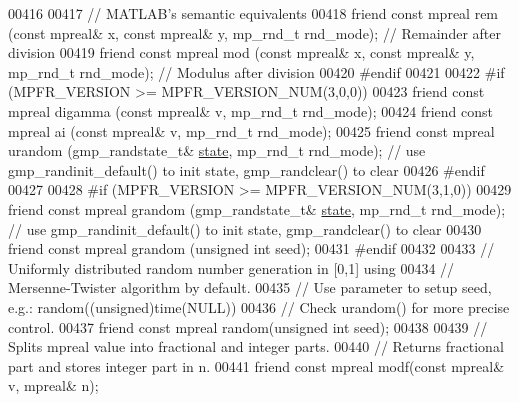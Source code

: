 \begin{DoxyCode}
00416 
00417     \textcolor{comment}{// MATLAB's semantic equivalents}
00418     \textcolor{keyword}{friend} \textcolor{keyword}{const} mpreal rem (\textcolor{keyword}{const} mpreal& x, \textcolor{keyword}{const} mpreal& y, mp\_rnd\_t rnd\_mode); \textcolor{comment}{// Remainder after
       division}
00419     \textcolor{keyword}{friend} \textcolor{keyword}{const} mpreal mod (\textcolor{keyword}{const} mpreal& x, \textcolor{keyword}{const} mpreal& y, mp\_rnd\_t rnd\_mode); \textcolor{comment}{// Modulus after
       division}
00420 \textcolor{preprocessor}{#endif}
00421 
00422 \textcolor{preprocessor}{#if (MPFR\_VERSION >= MPFR\_VERSION\_NUM(3,0,0))}
00423     \textcolor{keyword}{friend} \textcolor{keyword}{const} mpreal digamma (\textcolor{keyword}{const} mpreal& v,        mp\_rnd\_t rnd\_mode);
00424     \textcolor{keyword}{friend} \textcolor{keyword}{const} mpreal ai      (\textcolor{keyword}{const} mpreal& v,        mp\_rnd\_t rnd\_mode);
00425     \textcolor{keyword}{friend} \textcolor{keyword}{const} mpreal urandom (gmp\_randstate\_t& \hyperlink{structstate}{state}, mp\_rnd\_t rnd\_mode);     \textcolor{comment}{// use
       gmp\_randinit\_default() to init state, gmp\_randclear() to clear}
00426 \textcolor{preprocessor}{#endif}
00427 
00428 \textcolor{preprocessor}{#if (MPFR\_VERSION >= MPFR\_VERSION\_NUM(3,1,0))}
00429     \textcolor{keyword}{friend} \textcolor{keyword}{const} mpreal grandom (gmp\_randstate\_t& \hyperlink{structstate}{state}, mp\_rnd\_t rnd\_mode);     \textcolor{comment}{// use
       gmp\_randinit\_default() to init state, gmp\_randclear() to clear}
00430     \textcolor{keyword}{friend} \textcolor{keyword}{const} mpreal grandom (\textcolor{keywordtype}{unsigned} \textcolor{keywordtype}{int} seed);
00431 \textcolor{preprocessor}{#endif}
00432 
00433     \textcolor{comment}{// Uniformly distributed random number generation in [0,1] using}
00434     \textcolor{comment}{// Mersenne-Twister algorithm by default.}
00435     \textcolor{comment}{// Use parameter to setup seed, e.g.: random((unsigned)time(NULL))}
00436     \textcolor{comment}{// Check urandom() for more precise control.}
00437     \textcolor{keyword}{friend} \textcolor{keyword}{const} mpreal random(\textcolor{keywordtype}{unsigned} \textcolor{keywordtype}{int} seed);
00438 
00439     \textcolor{comment}{// Splits mpreal value into fractional and integer parts.}
00440     \textcolor{comment}{// Returns fractional part and stores integer part in n.}
00441     \textcolor{keyword}{friend} \textcolor{keyword}{const} mpreal modf(\textcolor{keyword}{const} mpreal& v, mpreal& n);

\end{DoxyCode}
